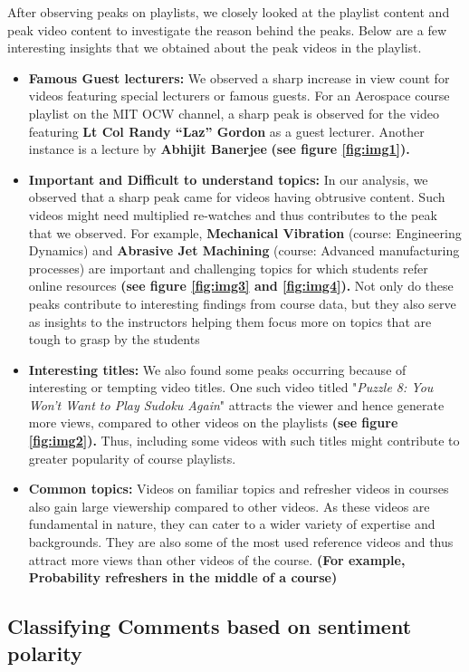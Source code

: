 \documentclass{article}
\begin{document}
After observing peaks on playlists, we closely looked at the playlist content and peak video content to investigate the reason behind the peaks. Below are a few interesting insights that we obtained about the peak videos in the playlist.
\begin{itemize}
    \item \textbf{Famous Guest lecturers:} We observed a sharp increase in view count for videos featuring special lecturers or famous guests. For an Aerospace course playlist on the MIT OCW channel, a sharp peak is observed for the video featuring \textbf{Lt Col Randy ``Laz'' Gordon} as a guest lecturer. Another instance is a lecture by \textbf{Abhijit Banerjee} \textbf{(see figure \ref{fig:img1}).} 
    \item \textbf{Important and Difficult to understand topics:}
    In our analysis, we observed that a sharp peak came for videos having obtrusive content. Such videos might need multiplied re-watches and thus contributes to the peak that we observed.
    For example, \textbf{Mechanical Vibration} (course: Engineering Dynamics) and \textbf{Abrasive Jet Machining} (course: Advanced manufacturing processes) are important and challenging topics for which students refer online resources \textbf{(see figure \ref{fig:img3} and \ref{fig:img4}).}  Not only do these peaks contribute to interesting findings from course data, but they also serve as insights to the instructors helping them focus more on topics that are tough to grasp by the students
    \item \textbf{Interesting titles:} We also found some peaks occurring because of interesting or tempting video titles. One such video titled "\textit{Puzzle 8: You Won't Want to Play Sudoku Again}" attracts the viewer and hence generate more views, compared to other videos on the playlists \textbf{(see figure \ref{fig:img2}).} Thus, including some videos with such titles might contribute to greater popularity of course playlists.
    \item \textbf{Common topics:} Videos on familiar topics and refresher videos in courses also gain large viewership compared to other videos. As these videos are fundamental in nature, they can cater to a wider variety of expertise and backgrounds. They are also some of the most used reference videos and thus attract more views than other videos of the course.  \textbf{(For example, Probability refreshers in the middle of a course)}
\end{itemize}


\subsection{Classifying Comments based on sentiment polarity}
\end{document}
